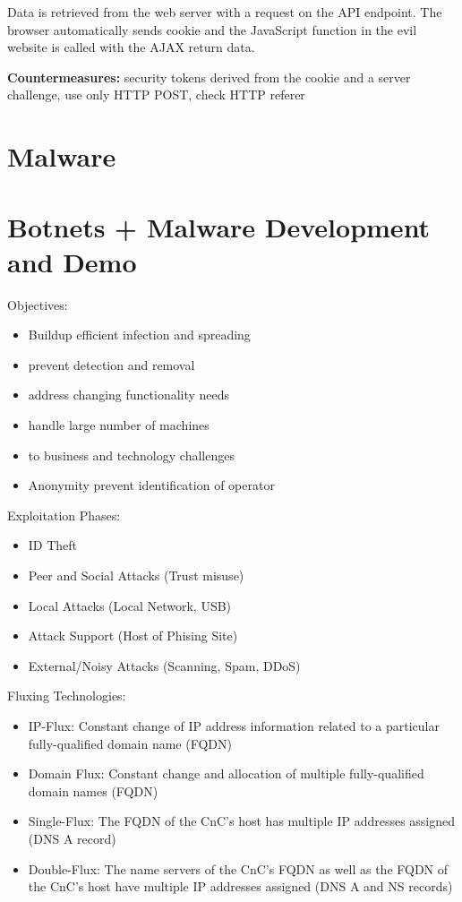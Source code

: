 \documentclass[fs, footer]{latex4ei}
\begin{document}
\begin{multicols*}{4}
Data is retrieved from the web server with a request on the API endpoint. The browser automatically sends cookie and the JavaScript function in the evil website is called with the AJAX return data.

\textbf{Countermeasures:} security tokens derived from the cookie and a server challenge, use only HTTP POST, check HTTP referer

\section{Malware}

\section{Botnets + Malware Development and Demo}
Objectives:
	\begin{itemize}
		\item Buildup efficient infection and spreading
		\item prevent detection and removal
		\item address changing functionality needs
		\item handle large number of machines
		\item to business and technology challenges
		\item Anonymity prevent identification of operator
	\end{itemize}

Exploitation Phases:
	\begin{itemize}
		\item ID Theft
		\item Peer and Social Attacks (Trust misuse)
		\item Local Attacks (Local Network, USB)
		\item Attack Support (Host of Phising Site)
		\item External/Noisy Attacks (Scanning, Spam, DDoS)
	\end{itemize}

Fluxing Technologies:
\begin{itemize}
	\item IP-Flux: Constant change of IP address information related to a particular fully-qualified domain name (FQDN)
	\item Domain Flux: Constant change and allocation of multiple fully-qualified domain names (FQDN)
	\item Single-Flux: The FQDN of the CnC’s host has multiple IP addresses assigned (DNS A record)
	\item Double-Flux: The name servers of the CnC’s FQDN as well as the FQDN of the CnC’s host have multiple IP addresses assigned (DNS A and NS records)
\end{itemize}


\end{multicols*}
\end{document}
